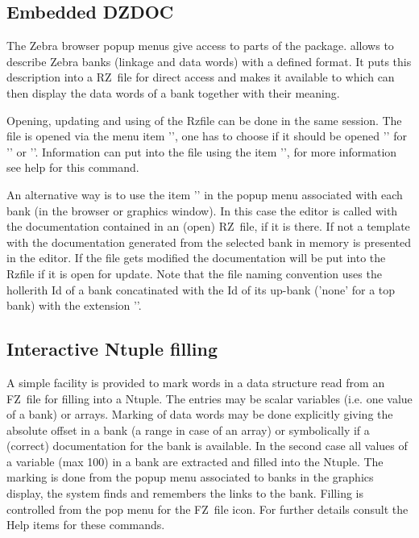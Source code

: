 \subsection{Embedded DZDOC}
 
The Zebra browser popup menus give access to parts of the
 package. 
 allows to describe Zebra banks (linkage
and data words) with a defined format.
It puts this description into a RZ~file for direct access
and makes it available to  which can then display the
data words of a bank together with their meaning.
 
Opening, updating and using of the Rzfile can be done in the
same session. The file is opened via the menu item
'', one has to choose if it should be
opened '' for '' or ''.
Information can put into the file using the item
'', for more information see help for this
command.
 
An alternative way is to use the item '' in
the popup menu associated with each bank (in the browser or
graphics window). 
In this case the editor is called with the
documentation contained in an (open) RZ~file, if it is there.
If not a template with the documentation generated from the
selected bank in memory is presented in the editor.
If the file gets modified the documentation will be put into
the Rzfile if it is open for update. Note that the file
naming convention uses the hollerith Id of a bank
concatinated with the Id of its up-bank ('none' for a top
bank) with the extension ''.
 
\subsection{Interactive Ntuple filling}
 
A simple facility is provided to mark words in a data structure
read from an FZ~file for filling into a Ntuple. The entries may
be scalar variables (i.e. one value of a bank) or arrays. 
Marking of data words may be done explicitly giving the absolute
offset in a bank (a range in case of an array) or symbolically
if a (correct) documentation for the bank is available. In the
second case all values of a variable (max 100) in a bank are 
extracted and filled into the Ntuple. 
The marking is done from the popup menu associated to banks in
the graphics display, the system finds and remembers the links
to the bank.
Filling is controlled from the pop menu for the FZ~file icon.
For further details consult the Help items for these commands.
 
